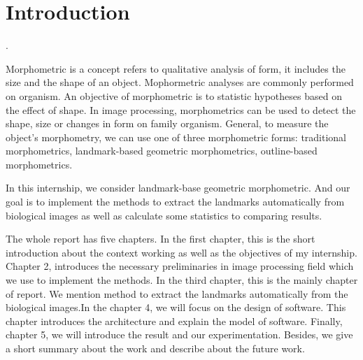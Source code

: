 \chapter*{Introduction}.

Morphometric is a concept refers to qualitative analysis of form, it includes the size and the shape of an object. Mophormetric analyses are commonly performed on organism. An objective of morphometric is to statistic hypotheses based on the effect of shape.
In image processing, morphometrics can be used to detect the shape, size or changes in form on family organism. General, to measure the object's morphometry, we can use one of three morphometric forms: traditional morphometrics, landmark-based geometric morphometrics, outline-based morphometrics.  

In this internship, we consider landmark-base geometric morphometric. And our goal is to implement the methods to extract the landmarks automatically from biological images as well as calculate some statistics to comparing results.

The whole report has five chapters. In the first chapter, this is the short introduction about the context working as well as the objectives of my internship. Chapter 2, introduces the necessary preliminaries in image processing field which we use to implement the methods. In the third chapter, this is the mainly chapter of report. We mention method to extract the landmarks automatically from the biological images.In the chapter 4, we will focus on the design of software. This chapter introduces the architecture and explain the model of software. Finally, chapter 5, we will introduce the result and our experimentation. Besides, we give a short summary about the work and describe about the future work.
